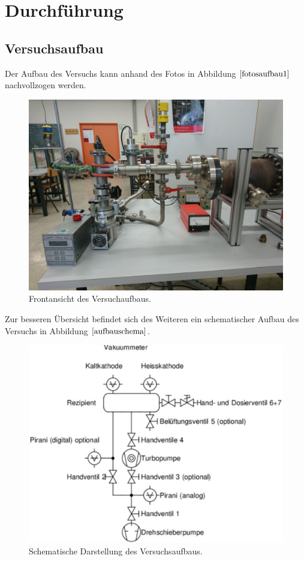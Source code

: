 \section{Durchführung}
\subsection{Versuchsaufbau}
Der Aufbau des Versuchs kann anhand des Fotos in Abbildung $\ref{fotosaufbau1}$ nachvollzogen werden.

\begin{figure}[H]
  \centering
  \includegraphics[scale=0.2]{Bilder/Versuch2.jpg}
  \caption{Frontansicht des Versuchaufbaus.}
  \label{fotosaufbau1}
\end{figure}
Zur besseren Übersicht befindet sich des Weiteren ein schematischer Aufbau des Versuchs in Abbildung $\ref{aufbauschema}$.
\begin{figure}[H]
  \centering
  \includegraphics[scale=0.4]{Bilder/schemaVersuch.png}
  \caption{Schematische Darstellung des Versuchsaufbaus.\cite{anleitung}}
  \label{aufbauschema}
\end{figure}
